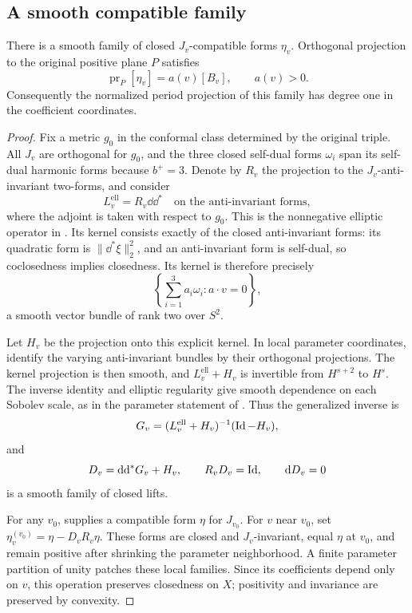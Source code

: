 \subsection{A smooth compatible family}

\begin{lemma}
 \label{lem:compatible-family}
 There is a smooth family of closed \(J_v\)-compatible forms
 \(\eta_v\).  Orthogonal projection to the original positive plane
 \(P\) satisfies
 \[
  \operatorname{pr}_P[\eta_v]=a(v)[B_v],\qquad a(v)>0.
 \]
 Consequently the normalized period projection of this family has
 degree one in the coefficient coordinates.
\end{lemma}

\begin{proof}
Fix a metric \(g_0\) in the conformal class determined by the original
triple.  All \(J_v\) are orthogonal for \(g_0\), and the three closed
self-dual forms \(\omega_i\) span its self-dual harmonic forms because
\(b^+=3\).  Denote by \(R_v\) the projection to the
\(J_v\)-anti-invariant two-forms, and consider
\[
 L_v^{\mathrm{ell}}=R_v\dd\dd^*
 \quad\text{on the anti-invariant forms},
\]
where the adjoint is taken with respect to \(g_0\).
This is the nonnegative elliptic operator in
.  Its kernel consists exactly of the closed
anti-invariant forms: its quadratic form is \(\|\dd^*\xi\|_2^2\),
and an anti-invariant form is self-dual, so coclosedness implies
closedness.  Its kernel is therefore precisely
\[
 \left\{\sum_{i=1}^3 a_i\omega_i:a\cdot v=0\right\},
\]
a smooth vector bundle of rank two over \(S^2\).

Let \(H_v\) be the projection onto this explicit kernel.  In local
parameter coordinates, identify the varying anti-invariant bundles by
their orthogonal projections.  The kernel projection is then smooth,
and \(L_v^{\mathrm{ell}}+H_v\) is invertible from \(H^{s+2}\)
to \(H^s\).  The inverse identity and elliptic regularity give
smooth dependence on each Sobolev scale, as in the parameter statement
of .  Thus the generalized inverse is
\[
 G_v=(L_v^{\mathrm{ell}}+H_v)^{-1}(\operatorname{Id}-H_v),
\]
and
\begin{equation}
 \label{eq:families-closed-correction}
 D_v=\mathrm d\mathrm d^*G_v+H_v,
 \qquad R_vD_v=\operatorname{Id},
 \qquad \mathrm d D_v=0
\end{equation}
is a smooth family of closed lifts.

For any \(v_0\),  supplies a compatible
form \(\eta\) for \(J_{v_0}\).  For \(v\) near \(v_0\), set
\(\eta_v^{(v_0)}=\eta-D_vR_v\eta\).  These forms are closed and
\(J_v\)-invariant, equal \(\eta\) at \(v_0\), and remain positive
after shrinking the parameter neighborhood.  A finite parameter
partition of unity patches these local families.  Since its
coefficients depend only on \(v\), this operation preserves
closedness on \(X\); positivity and invariance are preserved by
convexity.


\end{proof}
